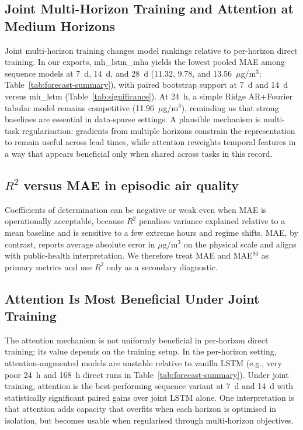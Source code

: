 \documentclass[a4paper,fleqn]{cas-sc}
\begin{document}
\subsection{Joint Multi-Horizon Training and Attention at Medium Horizons}

Joint multi-horizon training changes model rankings relative to per-horizon direct training. In our exports, mh\_lstm\_mha yields the lowest pooled MAE among sequence models at 7~d, 14~d, and 28~d (11.32, 9.78, and 13.56~$\mu$g/m$^3$; Table~\ref{tab:forecast-summary}), with paired bootstrap support at 7~d and 14~d versus mh\_lstm (Table~\ref{tab:significance}). At 24~h, a simple Ridge AR+Fourier tabular model remains competitive (11.96~$\mu$g/m$^3$), reminding us that strong baselines are essential in data-sparse settings. A plausible mechanism is multi-task regularisation: gradients from multiple horizons constrain the representation to remain useful across lead times, while attention reweights temporal features in a way that appears beneficial only when shared across tasks in this record.

\subsection{$R^2$ versus MAE in episodic air quality}

Coefficients of determination can be negative or weak even when MAE is operationally acceptable, because $R^2$ penalises variance explained relative to a mean baseline and is sensitive to a few extreme hours and regime shifts. MAE, by contrast, reports average absolute error in $\mu$g/m$^3$ on the physical scale and aligns with public-health interpretation. We therefore treat MAE and MAE$^{90}$ as primary metrics and use $R^2$ only as a secondary diagnostic.

\subsection{Attention Is Most Beneficial Under Joint Training}

The attention mechanism is not uniformly beneficial in per-horizon direct training; its value depends on the training setup. In the per-horizon setting, attention-augmented models are unstable relative to vanilla LSTM (e.g., very poor 24~h and 168~h direct runs in Table~\ref{tab:forecast-summary}). Under joint training, attention is the best-performing sequence variant at 7~d and 14~d with statistically significant paired gains over joint LSTM alone. One interpretation is that attention adds capacity that overfits when each horizon is optimised in isolation, but becomes usable when regularised through multi-horizon objectives.
\end{document}
